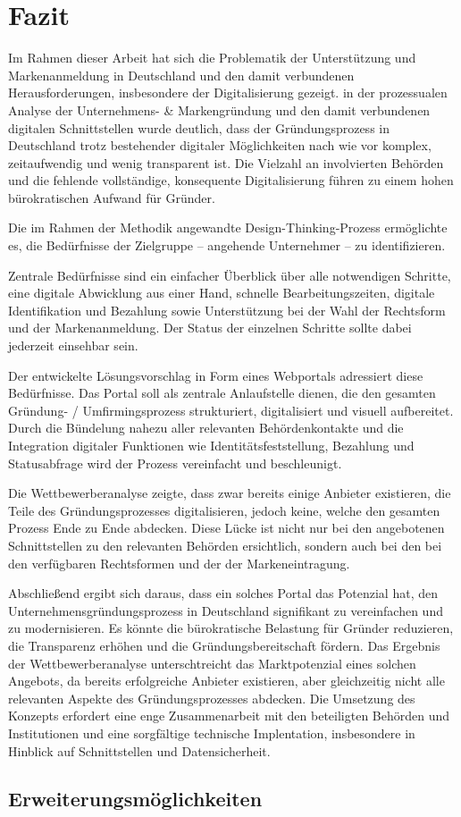 \newpage

\section{Fazit} \label{fazit}

Im Rahmen dieser Arbeit hat sich die Problematik der Unterstützung und Markenanmeldung in Deutschland und den damit verbundenen Herausforderungen, insbesondere der Digitalisierung gezeigt.
in der prozessualen Analyse der Unternehmens- & Markengründung und den damit verbundenen digitalen Schnittstellen wurde deutlich, dass der Gründungsprozess in Deutschland trotz bestehender digitaler Möglichkeiten nach wie vor komplex, zeitaufwendig und wenig transparent ist. 
Die Vielzahl an involvierten Behörden und die fehlende vollständige, konsequente Digitalisierung führen zu einem hohen bürokratischen Aufwand für Gründer.

Die im Rahmen der Methodik angewandte Design-Thinking-Prozess ermöglichte es, die Bedürfnisse der Zielgruppe – angehende Unternehmer – zu identifizieren.

Zentrale Bedürfnisse sind ein einfacher Überblick über alle notwendigen Schritte, eine digitale Abwicklung aus einer Hand, schnelle Bearbeitungszeiten, digitale Identifikation und Bezahlung sowie Unterstützung bei der Wahl der Rechtsform und der Markenanmeldung.
Der Status der einzelnen Schritte sollte dabei jederzeit einsehbar sein.

Der entwickelte Lösungsvorschlag in Form eines Webportals adressiert diese Bedürfnisse. Das Portal soll als zentrale Anlaufstelle dienen, die den gesamten Gründung- / Umfirmingsprozess strukturiert, digitalisiert und visuell aufbereitet.
Durch die Bündelung nahezu  aller relevanten Behördenkontakte und die Integration digitaler Funktionen wie Identitätsfeststellung, Bezahlung und Statusabfrage wird der Prozess vereinfacht und beschleunigt.

Die Wettbewerberanalyse zeigte, dass zwar bereits einige Anbieter existieren, die Teile des Gründungsprozesses digitalisieren, jedoch keine, welche den gesamten Prozess Ende zu Ende abdecken.
Diese Lücke ist nicht nur bei den angebotenen Schnittstellen zu den relevanten Behörden ersichtlich, sondern auch bei den bei den verfügbaren Rechtsformen und der der Markeneintragung.

Abschließend ergibt sich daraus, dass ein solches Portal das Potenzial hat, den Unternehmensgründungsprozess in Deutschland signifikant zu vereinfachen und zu modernisieren.
Es könnte die bürokratische Belastung für Gründer reduzieren, die Transparenz erhöhen und die Gründungsbereitschaft fördern.
Das Ergebnis der Wettbewerberanalyse unterschtreicht das Marktpotenzial eines solchen Angebots, da bereits erfolgreiche Anbieter existieren, aber gleichzeitig nicht alle relevanten Aspekte des Gründungsprozesses abdecken.
Die Umsetzung des Konzepts erfordert eine enge Zusammenarbeit mit den beteiligten Behörden und Institutionen und eine sorgfältige technische Implentation, insbesondere in Hinblick auf Schnittstellen und Datensicherheit.


\subsection{Erweiterungsmöglichkeiten} \label{erweiterungsmoeglichkeiten}
